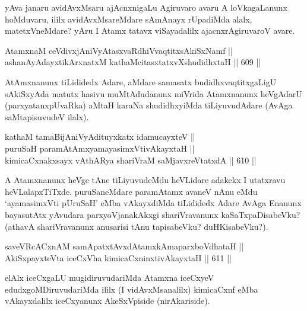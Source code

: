 \begin{artha}
yAva janaru avidAvxMsaru ajAcnxnigaLu Agiruvaro avaru A loVkagaLanunx
hoMduvaru, ililx avidAvxMsareMdare sAmAnayx rUpadiMda alalx,
matetxVneMdare? yAru I Atamx tatavx viSayadalilx ajacnxrAgiruvaroV avare.
\end{artha}


\begin{shl}
AtamxnaM ceVdivxjAniVyAtasxvaRdhiVvaqtitxsAkiSxNamf || \\
ashanAyAdayxtikArxnatxM kathaMcitasxtatxvXshudidhxtaH \hfill || 609 ||  
\end{shl}

\begin{artha}
AtAmxnanunx tiLididedx Adare, aMdare samasatx budidhxvaqtitxgaLigU
sAkiSxyAda matutx hasivu muMtAdudanunx miVrida Atamxnanunx heVgAdarU
(parxyatanxpUvaRka) aMtaH karaNa shudidhxyiMda tiLiyuvudAdare (AvAga saMtapisuvudeV ilalx).
\end{artha}


\begin{shl}
kathaM tamaBijAniVyAdituyxkatx idamucayxteV || \\
puruSaH paramAtAmx\s yamayasimxVtivAkayxtaH || \\
kimicaCxnakxsayx vA\s thARya shariVraM saMjavxreVtatxdA \hfill || 610 ||  
\end{shl}

\begin{artha}
A Atamxnanunx heVge tAne tiLiyuvudeMdu heVLidare adakekx I utatxravu heVLalapxTiTxde. puruSaneMdare paramAtamx avaneV nAnu eMdu `ayamasimxVti pUruSaH' eMba vAkayxdiMda tiLididedx Adare AvAga Enanunx bayasutAtx yAvudara parxyoVjanakAkxgi shariVravanunx kaSaTxpaDisabeVku? (athavA shariVravanunx anusarisi tAnu tapisabeVku? duHKisabeVku?).
\end{artha}


\begin{shl}
saveVRcACxnAM samApatxtAvxdAtamxkAmaparxboVdhataH || \\
AkiSxpayxteV\s ta iceCxVha kimicaCxninxtivAkayxtaH \hfill || 611 ||  
\end{shl}

\begin{artha}
elAlx iceCxgaLU mugidiruvudariMda Atamxna iceCxyeV edudxgoMDiruvudariMda ililx (I vidAvxMsanalilx) kimicaCxnf eMba vAkayxdalilx iceCxyanunx AkeSxVpiside (nirAkariside).
\end{artha}

